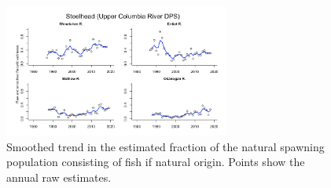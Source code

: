\documentclass[
  letterpaper,
  oneside,
  open=any]{scrbook}
\begin{document}
\begin{figure}

{\centering \includegraphics[width=2.92in,height=\textheight]{content/Interior_Columbia/../../media/image21.png}

}

\caption{\label{fig-UC-steelhead-smoothed-frac-wild}Smoothed trend in
the estimated fraction of the natural spawning population consisting of
fish if natural origin. Points show the annual raw estimates.}

\end{figure}
\end{document}
